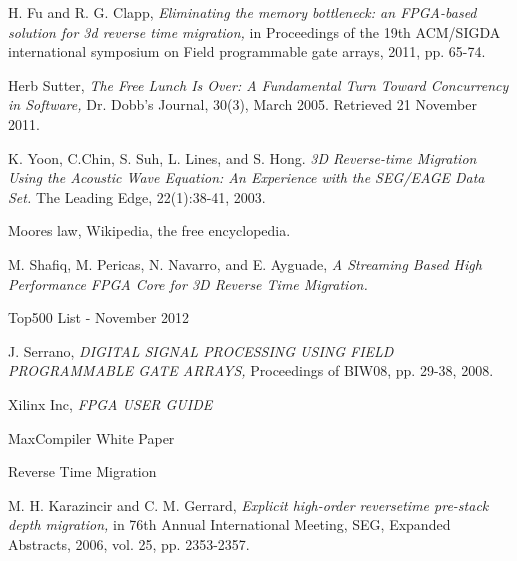 \begin{thebibliography}{9}
     H. Fu and R. G. Clapp, \emph{Eliminating the memory
    bottleneck: an FPGA-based solution for 3d reverse time migration,}
    in Proceedings of the 19th ACM/SIGDA international symposium on Field
    programmable gate arrays, 2011, pp. 65-74.

     Herb Sutter, \emph{The Free Lunch Is Over: A Fundamental
    Turn Toward Concurrency in Software,} Dr. Dobb's Journal, 30(3), March
    2005. Retrieved 21 November 2011.

     K. Yoon, C.Chin, S. Suh, L. Lines, and S. Hong.
    \emph{3D Reverse-time Migration Using the Acoustic Wave Equation:
    An Experience with the SEG/EAGE Data Set.} The Leading Edge, 22(1):38-41,
    2003.

     Moores law, Wikipedia, the free encyclopedia.

     M. Shafiq, M. Pericas, N. Navarro, and E. Ayguade,
    \emph{A Streaming Based High Performance FPGA Core for 3D Reverse
    Time Migration.}

     Top500 List - November 2012

    J. Serrano,
    \emph{DIGITAL SIGNAL PROCESSING USING FIELD PROGRAMMABLE GATE ARRAYS,}
    Proceedings of BIW08, pp. 29-38, 2008.

    Xilinx Inc,
    \emph{FPGA USER GUIDE}

    MaxCompiler White Paper

    Reverse Time Migration

    M. H. Karazincir and C. M. Gerrard,
    \emph{Explicit high-order reversetime pre-stack depth migration,}
    in 76th Annual International Meeting, SEG, Expanded Abstracts, 2006,
    vol. 25, pp. 2353-2357.

\end{thebibliography}
